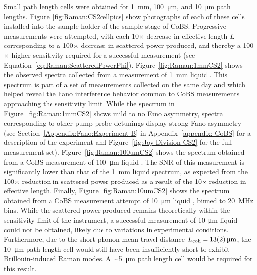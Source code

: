 Small path length cells were obtained for \SI{1}{\milli\meter}, \SI{100}{\micro\meter}, and \SI{10}{\micro\meter} path lengths. Figure~\ref{fig:Raman:CS2cellpics} show photographs of each of these cells installed into the sample holder of the sample stage of \ac{CoBS}. Progressive measurements were attempted, with each 10\(\times\) decrease in effective length \(L\) corresponding to a 100\(\times\) decrease in scattered power produced, and thereby a 100\(\times\) higher sensitivity required for a successful measurement (see Equation~\ref{eq:Raman:ScatteredPowerPhi}). Figure~\ref{fig:Raman:1mmCS2} shows the observed spectra collected from a measurement of \SI{1}{\milli\meter} liquid . This spectrum is part of a set of measurements collected on the same day and which helped reveal the Fano interference behavior common to \ac{CoBS} measurements approaching the sensitivity limit. While the spectrum in Figure~\ref{fig:Raman:1mmCS2} shows mild to no Fano asymmetry, spectra corresponding to other pump-probe detunings display strong Fano asymmetry (see Section~\ref{Appendix:Fano:Experiment B} in Appendix~\ref{appendix: CoBS} for a description of the experiment and Figure~\ref{fig:Joy Division CS2} for the full measurement set). Figure~\ref{fig:Raman:100umCS2} shows the spectrum obtained from a \ac{CoBS} measurement of \SI{100}{\micro\meter} liquid . The \ac{SNR} of this measurement is significantly lower than that of the \SI{1}{\milli\meter} liquid  spectrum, as expected from the 100\(\times\) reduction in scattered power produced as a result of the 10\(\times\) reduction in effective length. Finally, Figure~\ref{fig:Raman:10umCS2} shows the spectrum obtained from a \ac{CoBS} measurement attempt of \SI{10}{\micro\meter} liquid , binned to \SI{20}{\mega\hertz} bins. While the scattered power produced remains theoretically within the sensitivity limit of the instrument, a successful measurement of \SI{10}{\micro\meter} liquid  could not be obtained, likely due to variations in experimental conditions. Furthermore, due to the short phonon mean travel distance \(L_{\rm coh} = \SI{13(2)}{\micro\meter}\), the \SI{10}{\micro\meter} path length cell would still have been insufficiently short to exhibit Brillouin-induced Raman modes. A \(\sim\)\SI{5}{\micro\meter} path length cell would be required for this result.

